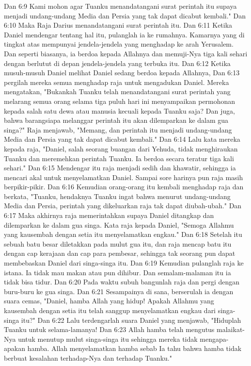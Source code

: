 Dan 6:9  Kami mohon agar Tuanku menandatangani surat perintah itu supaya menjadi undang-undang Media dan Persia yang tak dapat dicabut kembali."
Dan 6:10  Maka Raja Darius menandatangani surat perintah itu.
Dan 6:11  Ketika Daniel mendengar tentang hal itu, pulanglah ia ke rumahnya. Kamarnya yang di tingkat atas mempunyai jendela-jendela yang menghadap ke arah Yerusalem. Dan seperti biasanya, ia berdoa kepada Allahnya dan memuji-Nya tiga kali sehari dengan berlutut di depan jendela-jendela yang terbuka itu.
Dan 6:12  Ketika musuh-musuh Daniel melihat Daniel sedang berdoa kepada Allahnya,
Dan 6:13  pergilah mereka semua menghadap raja untuk mengadukan Daniel. Mereka mengatakan, "Bukankah Tuanku telah menandatangani surat perintah yang melarang semua orang selama tiga puluh hari ini menyampaikan permohonan kepada salah satu dewa atau manusia kecuali kepada Tuanku saja? Dan juga, bahwa barangsiapa melanggar perintah itu akan dilemparkan ke dalam gua singa?" Raja menjawab, "Memang, dan perintah itu menjadi undang-undang Media dan Persia yang tak dapat dicabut kembali."
Dan 6:14  Lalu kata mereka kepada raja, "Daniel, salah seorang buangan dari Yehuda, tidak menghiraukan Tuanku dan meremehkan perintah Tuanku. Ia berdoa secara teratur tiga kali sehari."
Dan 6:15  Mendengar itu raja menjadi sedih dan khawatir, sehingga ia mencari akal untuk menyelamatkan Daniel. Sampai sore harinya pun raja masih berpikir-pikir.
Dan 6:16  Kemudian orang-orang itu kembali menghadap raja dan berkata, "Tuanku, hendaknya Tuanku ingat bahwa menurut undang-undang Media dan Persia, perintah yang dikeluarkan raja tak dapat diubah-ubah."
Dan 6:17  Maka akhirnya raja memerintahkan supaya Daniel ditangkap dan dilemparkan ke dalam gua singa. Kata raja kepada Daniel, "Semoga Allahmu yang kausembah dengan setia itu menyelamatkan engkau."
Dan 6:18  Setelah itu sebuah batu besar diletakkan pada mulut gua itu, dan raja mencap batu itu dengan cap kerajaan dan cap para pembesar, sehingga tak seorang pun dapat membebaskan Daniel dari singa-singa itu.
Dan 6:19  Kemudian pulanglah raja ke istana. Ia tidak mau makan atau pun dihibur. Dan semalam-malaman itu ia tidak bisa tidur.
Dan 6:20  Pada waktu subuh bangunlah raja dan pergi dengan buru-buru ke gua singa.
Dan 6:21  Sesampainya di sana, berserulah ia dengan suara cemas, "Daniel, hamba Allah yang hidup! Apakah Allahmu yang kausembah dengan setia itu telah sanggup menyelamatkan engkau dari singa-singa itu?"
Dan 6:22  Lalu terdengarlah suara Daniel yang menjawab, "Hiduplah Tuanku untuk selama-lamanya!
Dan 6:23  Allah hamba telah mengutus malaikat-Nya untuk menutup mulut singa-singa itu sehingga mereka tidak mengapa-apakan hamba. Allah menyelamatkan hamba sebab Ia tahu bahwa hamba tidak berbuat kesalahan terhadap-Nya dan terhadap Tuanku."
